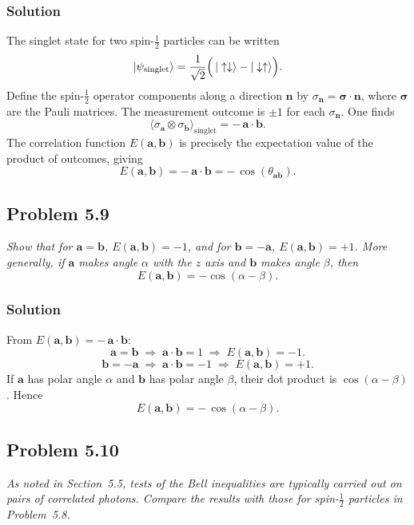 \documentclass[twocolumn]{article}
\begin{document}
\begin{spacing}{1}
\subsubsection*{Solution}
The singlet state for two spin-$\tfrac12$ particles can be written
\[
|\psi_{\text{singlet}}\rangle 
= \frac{1}{\sqrt{2}}\Bigl(\,|\uparrow\downarrow\rangle - |\downarrow\uparrow\rangle\Bigr).
\]
Define the spin-$\tfrac12$ operator components along a direction $\mathbf{n}$ by 
\(\sigma_{\mathbf{n}} = \boldsymbol{\sigma}\cdot\mathbf{n}\), 
where $\boldsymbol{\sigma}$ are the Pauli matrices. The measurement outcome is $\pm1$ for each $\sigma_{\mathbf{n}}$. One finds
\[
\langle \sigma_{\mathbf{a}} \otimes \sigma_{\mathbf{b}} \rangle_{\text{singlet}}
= -\,\mathbf{a}\cdot\mathbf{b}.
\]
The correlation function $E(\mathbf{a},\mathbf{b})$ is precisely the expectation value of the product of outcomes, giving
\[
E(\mathbf{a},\mathbf{b}) 
= -\,\mathbf{a}\cdot\mathbf{b} 
= -\,\cos(\theta_{\mathbf{ab}}).
\]

\subsection{Problem 5.9}
\textit{Show that for $\mathbf{a} = \mathbf{b}$, $E(\mathbf{a},\mathbf{b}) = -1$, and for $\mathbf{b}=-\mathbf{a}$, $E(\mathbf{a},\mathbf{b}) = +1$. More generally, if $\mathbf{a}$ makes angle $\alpha$ with the $z$ axis and $\mathbf{b}$ makes angle $\beta$, then
\[
E(\mathbf{a},\mathbf{b}) = -\cos(\alpha - \beta).
\]}

\subsubsection*{Solution}
From $E(\mathbf{a},\mathbf{b}) = -\,\mathbf{a}\cdot\mathbf{b}$:
\[
\mathbf{a} = \mathbf{b}
\;\Longrightarrow\;
\mathbf{a}\cdot\mathbf{b} = 1 
\;\Longrightarrow\;
E(\mathbf{a},\mathbf{b}) = -1.
\]
\[
\mathbf{b} = -\mathbf{a}
\;\Longrightarrow\;
\mathbf{a}\cdot\mathbf{b} = -1 
\;\Longrightarrow\;
E(\mathbf{a},\mathbf{b}) = +1.
\]
If $\mathbf{a}$ has polar angle $\alpha$ and $\mathbf{b}$ has polar angle $\beta$, their dot product is $\cos(\alpha-\beta)$. Hence
\[
E(\mathbf{a},\mathbf{b}) 
= -\,\cos(\alpha-\beta).
\]

\subsection{Problem 5.10}
\textit{As noted in Section~5.5, tests of the Bell inequalities are typically carried out on pairs of correlated photons. Compare the results with those for spin-$\tfrac12$ particles in Problem~5.8.}


\end{spacing}
\end{document}
